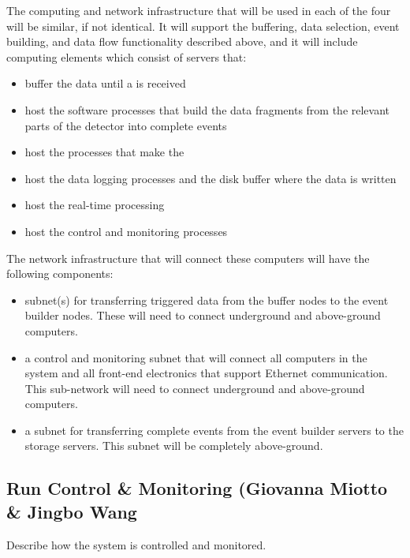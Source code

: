 The computing and network infrastructure that will be used in each
of the four  will be similar, if not identical.
It will support the buffering, data selection, event
building, and data flow functionality described
above, and it will include computing elements which consist of servers that:

\begin{itemize}
\item buffer the data until a 
  is received
\item host the software processes that
  build the data fragments from the relevant
  parts of the detector into complete events
\item host the processes that make the
\item host the data logging processes and
  the disk buffer where the data is written
\item host the real-time  processing
\item host the control and monitoring processes
\end{itemize}

The network infrastructure that will connect these computers
will have the following components:

\begin{itemize}
\item subnet(s) for transferring triggered data from the buffer
  nodes to the event builder nodes.  These will need to
  connect underground and above-ground computers.
\item a control and monitoring subnet that will connect all
  computers in the  system and all front-end
  electronics that support Ethernet communication.  This
  sub-network will need to connect underground and
  above-ground computers.
\item a subnet for transferring complete events from the
  event builder servers to the storage servers.  This subnet
  will be completely above-ground.
\end{itemize}

\subsection{Run Control \& Monitoring (Giovanna Miotto \& Jingbo Wang}
\label{sec:fdsp-daq-tcm}

Describe how the system is controlled and monitored.

